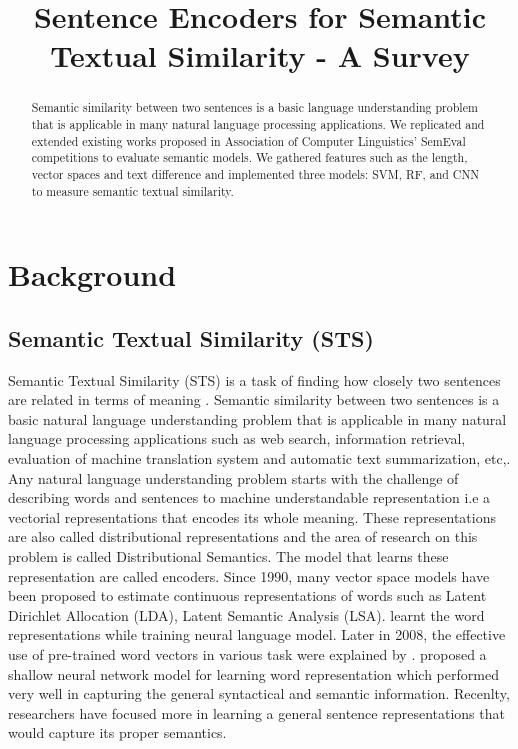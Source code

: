 \documentclass[12pt]{article} %
\title{Sentence Encoders for Semantic Textual Similarity - A Survey}
\begin{document}
\maketitle


\begin{abstract}
Semantic similarity between two sentences is a basic language understanding problem that is applicable in many natural language processing applications. We replicated and extended existing works proposed in Association of Computer Linguistics' SemEval competitions to evaluate semantic models. We gathered features such as the length, vector spaces and text difference and implemented three models: SVM, RF, and CNN to measure semantic textual similarity. 
\end{abstract}

\section{Background}
\subsection{Semantic Textual Similarity (STS)}

Semantic Textual Similarity (STS) is a task of finding how closely two sentences are related in terms of meaning \cite{cer2017semeval}. Semantic similarity between two sentences is a basic natural language understanding problem that is applicable in many natural language processing applications such as web search, information retrieval, evaluation of machine translation system and automatic text summarization, etc,. Any natural language understanding problem starts with the challenge of describing words and sentences to machine understandable representation i.e a vectorial representations that encodes its whole meaning. These representations are also called distributional representations and the area of research on this problem is called Distributional Semantics. The model that learns these representation are called encoders. Since 1990, many vector space models have been proposed to estimate continuous representations of words  such as Latent Dirichlet Allocation (LDA), Latent Semantic Analysis (LSA). \cite{bengio2003neural} learnt the word representations while training neural language model. Later in 2008, the effective use of pre-trained word vectors in various task were explained by \cite{collobert2008unified}. \cite{mikolov2014word2vec} proposed a shallow neural network model for learning word representation which performed very well in capturing the general syntactical and semantic information. Recenlty, researchers have focused more in learning a general sentence representations that would capture its proper semantics. 
\end{document}
